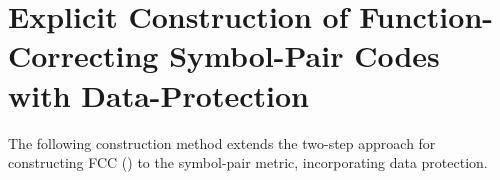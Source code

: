 \documentclass[11pt,draftclsnofoot,journal,onecolumn]{IEEEtran}
\newtheorem{remark}{Remark}
\begin{document}
    

\section{Explicit Construction of Function-Correcting Symbol-Pair Codes with Data-Protection}\label{sec:construction}

    
    \noindent
    The following construction method extends the two-step approach for constructing FCC (\cite{rajput2025function}) to the symbol-pair metric, incorporating data protection.
    
\end{document}
